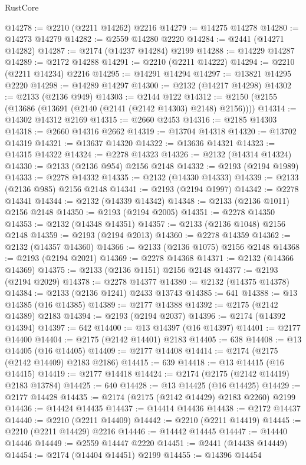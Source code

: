 \begin{lexlean}{RustCore}
\begin{coremodule}
@14278 := @2210 (@2211 @14262) @2216
@14279 := @14275 @14278
@14280 := @14273 @14279
@14282 := @2559 @14280 @2220
@14284 := @2441 (@14271 @14282)
@14287 := @2174 (@14237 @14284) @2199
@14288 := @14229 @14287
@14289 := @2172 @14288
@14291 := @2210 (@2211 @14222)
@14294 := @2210 (@2211 @14234) @2216
@14295 := @14291 @14294
@14297 := @13821 @14295 @2220
@14298 := @14289 @14297
@14300 := @2132 (@14217 @14298)
@14302 := @2133 (@2136 @949)
@14303 := @2144 @122
@14312 := @2150 (@2155 (@13686 (@13691 (@2140 (@2141 (@2142 @14303) @2148) @2156))))
@14314 := @14302 @14312 @2169
@14315 := @2660 @2453
@14316 := @2185 @14303
@14318 := @2660 @14316 @2662
@14319 := @13704 @14318
@14320 := @13702 @14319
@14321 := @13637 @14320
@14322 := @13636 @14321
@14323 := @14315 @14322
@14324 := @2278 @14323
@14326 := @2132 (@14314 @14324)
@14330 := @2133 (@2136 @954) @2156 @2148
@14332 := @2193 (@2194 @1989)
@14333 := @2278 @14332
@14335 := @2132 (@14330 @14333)
@14339 := @2133 (@2136 @985) @2156 @2148
@14341 := @2193 (@2194 @1997)
@14342 := @2278 @14341
@14344 := @2132 (@14339 @14342)
@14348 := @2133 (@2136 @1011) @2156 @2148
@14350 := @2193 (@2194 @2005)
@14351 := @2278 @14350
@14353 := @2132 (@14348 @14351)
@14357 := @2133 (@2136 @1048) @2156 @2148
@14359 := @2193 (@2194 @2013)
@14360 := @2278 @14359
@14362 := @2132 (@14357 @14360)
@14366 := @2133 (@2136 @1075) @2156 @2148
@14368 := @2193 (@2194 @2021)
@14369 := @2278 @14368
@14371 := @2132 (@14366 @14369)
@14375 := @2133 (@2136 @1151) @2156 @2148
@14377 := @2193 (@2194 @2029)
@14378 := @2278 @14377
@14380 := @2132 (@14375 @14378)
@14384 := @2133 (@2136 @1241) @2433 @13743
@14385 := 641
@14388 := @13 @14385 (@16 @14385)
@14389 := @2177 @14388
@14392 := @2175 (@2142 @14389) @2183
@14394 := @2193 (@2194 @2037)
@14396 := @2174 (@14392 @14394)
@14397 := 642
@14400 := @13 @14397 (@16 @14397)
@14401 := @2177 @14400
@14404 := @2175 (@2142 @14401) @2183
@14405 := 638
@14408 := @13 @14405 (@16 @14405)
@14409 := @2177 @14408
@14414 := @2174 (@2175 (@2142 @14409) @2183 @2186)
@14415 := 639
@14418 := @13 @14415 (@16 @14415)
@14419 := @2177 @14418
@14424 := @2174 (@2175 (@2142 @14419) @2183 @13784)
@14425 := 640
@14428 := @13 @14425 (@16 @14425)
@14429 := @2177 @14428
@14435 := @2174 (@2175 (@2142 @14429) @2183 @2260) @2199
@14436 := @14424 @14435
@14437 := @14414 @14436
@14438 := @2172 @14437
@14440 := @2210 (@2211 @14409)
@14442 := @2210 (@2211 @14419)
@14445 := @2210 (@2211 @14429) @2216
@14446 := @14442 @14445
@14447 := @14440 @14446
@14449 := @2559 @14447 @2220
@14451 := @2441 (@14438 @14449)
@14454 := @2174 (@14404 @14451) @2199
@14455 := @14396 @14454

\end{coremodule}
\end{lexlean}

